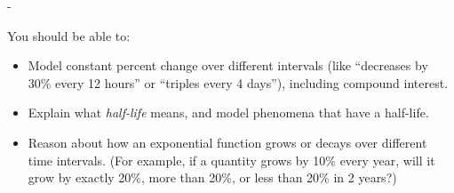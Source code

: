 \documentclass{article}
\makeatletter
\newlength{\tipmargin}
\renewenvironment{framed}{
  \setlength{\tipmargin}{\textwidth-\linewidth}
  \advance\@totalleftmargin-\tipmargin
  \def\FrameCommand{\hspace{\tipmargin}\fbox}%
  \advance\linewidth\tipmargin
  \MakeFramed {\advance\hsize-\width \FrameRestore}%
}
{\endMakeFramed}
\makeatother
\begin{document}

\begin{problemonly}
  \begin{framed}

You should be able to:
    \begin{itemize}[topsep=0pt,partopsep=0pt,parsep=8pt,itemsep=0pt]
    \item Model constant percent change over different intervals (like ``decreases by 30\% every 12 hours'' or ``triples every 4 days''), including compound interest.

    \item Explain what \emph{half-life} means, and model phenomena that have a half-life. 

    \item Reason about how an exponential function grows or decays over different time intervals. (For example, if a quantity grows by 10\% every year, will it grow by exactly 20\%, more than 20\%, or less than 20\% in 2 years?)

    \end{itemize}
  \end{framed}
\end{problemonly}
\end{document}
